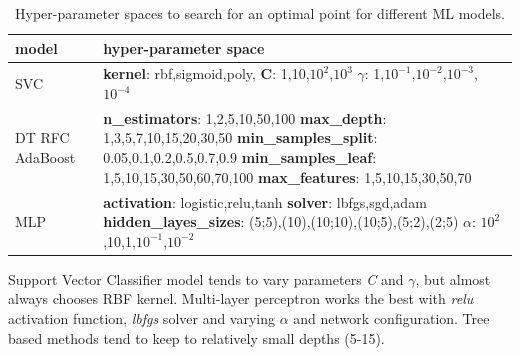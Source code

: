 \documentclass[sigconf,10pt,review,anonymous]{acmart}
\begin{document}
\begin{table}[h!]
    \centering
    \begin{tabular}[c]{|p{2.0cm}|p{5.0cm}|}
        \hline
        model & hyper-parameter space\\
        \hline
        SVC & \textbf{kernel}: rbf,sigmoid,poly, \textbf{C}: 1,10,$10^2$,$10^3$ \textbf{$\gamma$}: 1,$10^{-1}$,$10^{-2}$,$10^{-3}$,$10^{-4}$\\
        \hline
        DT RFC AdaBoost & \textbf{n\_estimators}: 1,2,5,10,50,100 \textbf{max\_depth}: 1,3,5,7,10,15,20,30,50 \textbf{min\_samples\_split}: 0.05,0.1,0.2,0.5,0.7,0.9 \textbf{min\_samples\_leaf}: 1,5,10,15,30,50,60,70,100 \textbf{max\_features}: 1,5,10,15,30,50,70\\
        \hline
        MLP & \textbf{activation}: logistic,relu,tanh \textbf{solver}: lbfgs,sgd,adam \textbf{hidden\_layes\_sizes}: (5;5),(10),(10;10),(10;5),(5;2),(2;5) \textbf{$\alpha$}: $10^2$,10,1,$10^{-1}$,$10^{-2}$\\
        \hline
    \end{tabular}
    \caption{Hyper-parameter spaces to search for an optimal point for different ML models.}
    \label{tab:hyper_param_space}
\end{table}

\quad Support Vector Classifier model tends to vary parameters \textit{C} and $\gamma$, but almost always chooses RBF kernel. Multi-layer perceptron works the best with \textit{relu} activation function, \textit{lbfgs} solver and varying $\alpha$ and network configuration. Tree based methods tend to keep to relatively small depths (5-15).    

\end{document}
